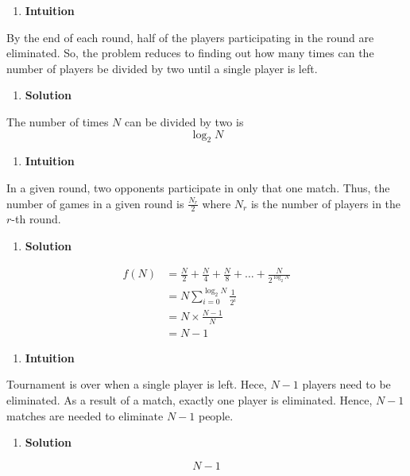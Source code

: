 \documentclass[]{book}
\providecommand{\tightlist}{%
  \setlength{\itemsep}{0pt}\setlength{\parskip}{0pt}}
\begin{document}
\begin{enumerate}
\def\labelenumi{(\alph{enumi})}
\tightlist
\item
  \textbf{Intuition}
\end{enumerate}

By the end of each round, half of the players participating in the round
are eliminated. So, the problem reduces to finding out how many times
can the number of players be divided by two until a single player is
left.

\begin{enumerate}
\def\labelenumi{(\alph{enumi})}
\tightlist
\item
  \textbf{Solution}
\end{enumerate}

The number of times \(N\) can be divided by two is \[\log_{2}{N}\]

\begin{enumerate}
\def\labelenumi{(\alph{enumi})}
\setcounter{enumi}{1}
\tightlist
\item
  \textbf{Intuition}
\end{enumerate}

In a given round, two opponents participate in only that one match.
Thus, the number of games in a given round is \(\frac{N_{r}}{2}\) where
\(N_{r}\) is the number of players in the \(r\)-th round.

\begin{enumerate}
\def\labelenumi{(\alph{enumi})}
\setcounter{enumi}{1}
\tightlist
\item
  \textbf{Solution}
\end{enumerate}

\begin{equation} 
\begin{split}
 f(N) & = \frac{N}{2} + \frac{N}{4}  + \frac{N}{8} + \dots + \frac{N}{2^{\log_{2}{N}}}\\
 & =N \sum_{i=0}^{\log_{2}{N}} \frac{1}{2^{i}}\\
 & =N \times \frac{N-1}{N}\\
 & =N-1
\end{split}
\label{eq:var-beta}
\end{equation}

\begin{enumerate}
\def\labelenumi{(\alph{enumi})}
\setcounter{enumi}{2}
\tightlist
\item
  \textbf{Intuition}
\end{enumerate}

Tournament is over when a single player is left. Hece, \(N-1\) players
need to be eliminated. As a result of a match, exactly one player is
eliminated. Hence, \(N-1\) matches are needed to eliminate \(N-1\)
people.

\begin{enumerate}
\def\labelenumi{(\alph{enumi})}
\setcounter{enumi}{2}
\tightlist
\item
  \textbf{Solution}
\end{enumerate}

\[ N-1 \]


\end{document}
